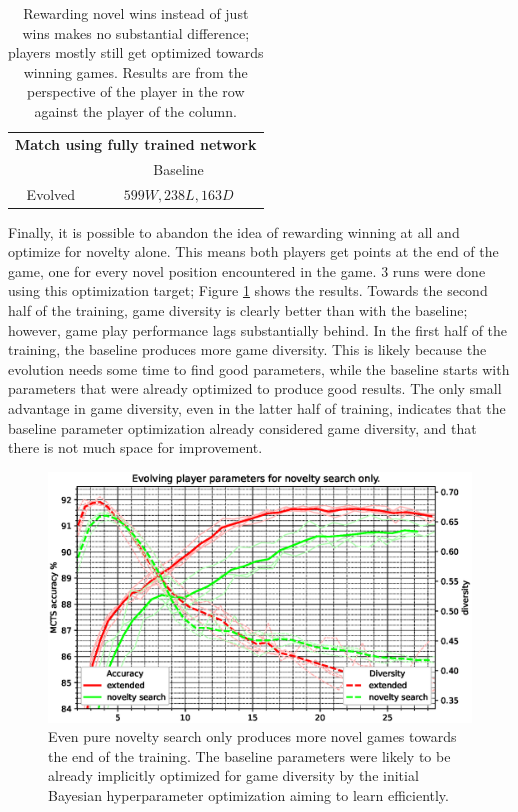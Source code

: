 \documentclass[12pt,onecolumn,oneside,titlepage]{article}
\begin{document}
\begin{table} [H]
 \centering

  \begin{tabular}{ c c }
  \multicolumn{2}{c}{\textbf{Match using fully trained network}} \\
	       & Baseline  \\
  \hline
  Evolved & $599W, 238L, 163D$
  \end{tabular}
  
  \caption{Rewarding novel wins instead of just wins makes no substantial difference; players mostly still get optimized towards winning games.
  Results are from the perspective of the player in the row against the player of the column.}
  \label{t:novel_win_fail}
\end{table}

Finally, it is possible to abandon the idea of rewarding winning at all and optimize for novelty alone.
This means both players get points at the end of the game, one for every novel position encountered in the game. $3$ runs were done using this optimization target;
Figure \ref{fig:pure_novelty_search} shows the results. Towards the second half of the training, game diversity is clearly better than with the baseline; however, game play performance lags substantially behind.
In the first half of the training, the baseline produces more game diversity. This is likely because the evolution needs some time
to find good parameters, while the baseline starts with parameters that were already optimized to produce good results.
The only small advantage in game diversity, even in the latter half of training, indicates that the baseline parameter optimization already considered game diversity, and that there is not much space for improvement.

\begin{figure}[H]
\centering
\includegraphics[clip,width=\columnwidth]{pure_novelty_search}
\caption{Even pure novelty search only produces more novel games towards the end of the training.
The baseline parameters were likely to be already implicitly optimized for game diversity by the initial Bayesian hyperparameter optimization aiming to learn efficiently.}
\label{fig:pure_novelty_search}
\end{figure}
\end{document}
